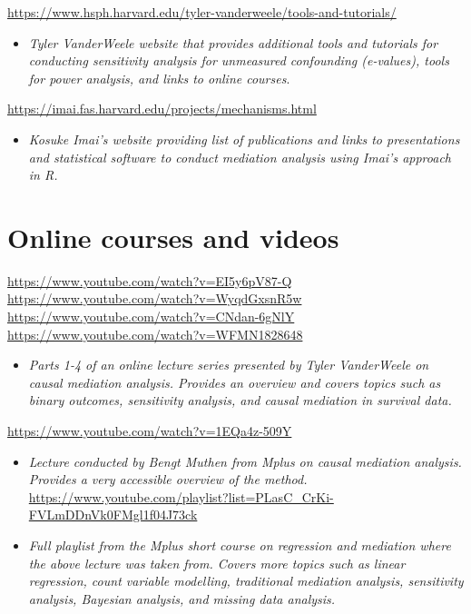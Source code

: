 \documentclass[
]{book}
\providecommand{\tightlist}{%
  \setlength{\itemsep}{0pt}\setlength{\parskip}{0pt}}
\begin{document}
\url{https://www.hsph.harvard.edu/tyler-vanderweele/tools-and-tutorials/}

\begin{itemize}
\tightlist
\item
  \emph{Tyler VanderWeele website that provides additional tools and tutorials for conducting sensitivity analysis for unmeasured confounding (e-values), tools for power analysis, and links to online courses}.
\end{itemize}

\url{https://imai.fas.harvard.edu/projects/mechanisms.html}

\begin{itemize}
\tightlist
\item
  \emph{Kosuke Imai's website providing list of publications and links to presentations and statistical software to conduct mediation analysis using Imai's approach in R.}
\end{itemize}

\section{Online courses and videos}\label{online-courses-and-videos-2}

\url{https://www.youtube.com/watch?v=EI5y6pV87-Q}
\url{https://www.youtube.com/watch?v=WyqdGxsnR5w}
\url{https://www.youtube.com/watch?v=CNdan-6gNlY}
\url{https://www.youtube.com/watch?v=WFMN1828648}

\begin{itemize}
\tightlist
\item
  \emph{Parts 1-4 of an online lecture series presented by Tyler VanderWeele on causal mediation analysis. Provides an overview and covers topics such as binary outcomes, sensitivity analysis, and causal mediation in survival data.}
\end{itemize}

\url{https://www.youtube.com/watch?v=1EQa4z-509Y}

\begin{itemize}
\item
  \emph{Lecture conducted by Bengt Muthen from Mplus on causal mediation analysis. Provides a very accessible overview of the method.}
  \url{https://www.youtube.com/playlist?list=PLasC_CrKi-FVLmDDnVk0FMgl1f04J73ck}
\item
  \emph{Full playlist from the Mplus short course on regression and mediation where the above lecture was taken from. Covers more topics such as linear regression, count variable modelling, traditional mediation analysis, sensitivity analysis, Bayesian analysis, and missing data analysis.}
\end{itemize}
\end{document}
